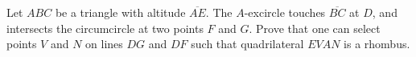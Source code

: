 Let $ABC$ be a triangle with altitude $\overline{AE}$. The $A$-excircle touches $\overline{BC}$ at $D$, and intersects the circumcircle at two points $F$ and $G$. Prove that one can select points $V$ and $N$ on lines $DG$ and $DF$ such that quadrilateral $EVAN$ is a rhombus.